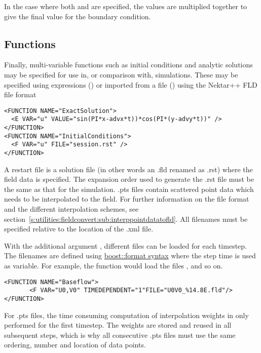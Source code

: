 In the case where both  and  are specified, the values
are multiplied together to give the final value for the boundary condition. 

\subsection{Functions}

Finally, multi-variable functions such as initial conditions and analytic
solutions may be specified for use in, or comparison with, simulations. These
may be specified using expressions () or imported from a file
() using the Nektar++ FLD file format

\begin{lstlisting}[style=XMLStyle]
<FUNCTION NAME="ExactSolution">
  <E VAR="u" VALUE="sin(PI*x-advx*t))*cos(PI*(y-advy*t))" />
</FUNCTION>
<FUNCTION NAME="InitialConditions">
  <F VAR="u" FILE="session.rst" />
</FUNCTION>
\end{lstlisting}

A restart file is a solution file (in other words an .fld renamed as .rst) where
the field data is specified. The expansion order used to generate the .rst file
must be the same as that for the simulation.
.pts files contain scattered point data which needs to be interpolated to the field.
For further information on the file format and the different interpolation schemes, see
section~\ref{s:utilities:fieldconvert:sub:interppointdatatofld}.
All filenames must be specified relative to the location of the .xml file.

With the additional argument , different files can be
loaded for each timestep. The filenames are defined using
\href{http://www.boost.org/doc/libs/1_56_0/libs/format/doc/format.html#syntax}{boost::format syntax}
where the step time is used as variable. For example, the function
 would load the files ,
 and so on.

\begin{lstlisting}[style=XMLStyle]
<FUNCTION NAME="Baseflow">
       <F VAR="U0,V0" TIMEDEPENDENT="1"FILE="U0V0_%14.8E.fld"/>
</FUNCTION>
\end{lstlisting}

For .pts files, the time consuming computation of interpolation weights in only
performed for the first timestep. The weights are stored and reused in all subsequent steps, 
which is why all consecutive .pts files must use the same ordering, number and location of
data points.

